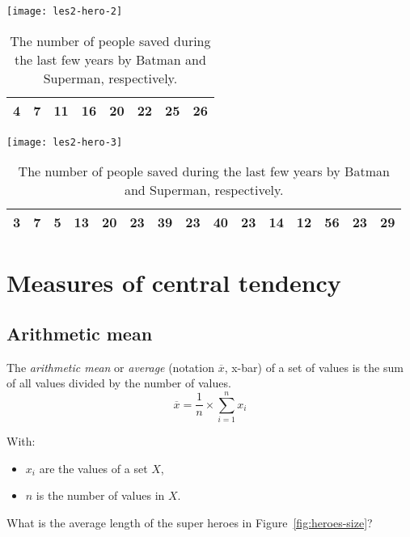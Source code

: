 \begin{table}
  
  \begin{center}
      \texttt{[image: les2-hero-2]}
    \begin{tabular}{|c|c|c|c|c|c|c|c|}
      \hline
      4 & 7 & 11 & 16 & 20 & 22 & 25 & 26 \\
      \hline
    \end{tabular}
  
    \texttt{[image: les2-hero-3]}
    \begin{tabular}{|c|c|c|c|c|c|c|c|c|c|c|c|c|c|c|}
      \hline
      3&7&5&13&20&23&39&23&40&23&14&12&56&23&29\\
      \hline
    \end{tabular}
  \end{center}
  
  \caption{The number of people saved during the last few years by Batman and Superman, respectively.}
  \label{tab:heroes-saves}
\end{table}

\section{Measures of central tendency}
\label{sec:measures-of-central-tendency}

\subsection{Arithmetic mean}
\label{ssec:arithmetic-mean}

\begin{definition}
  The \emph{arithmetic mean} or \emph{average} (notation $\overline{x}$, x-bar) of a set of values is the sum of all values divided by the number of values.
  \begin{equation}
    \overline{x} = \frac{1}{n} \times \sum_{i=1}^{n} x_{i}
    \label{eq:Mean}
  \end{equation}

  With:
  \begin{itemize}
    \item $x_{i}$ are the values of a set $X$,
    \item $n$ is the number of values in $X$.
  \end{itemize}
\end{definition}

\begin{exercise}
  What is the average length of the super heroes in Figure~\ref{fig:heroes-size}?
\end{exercise}

